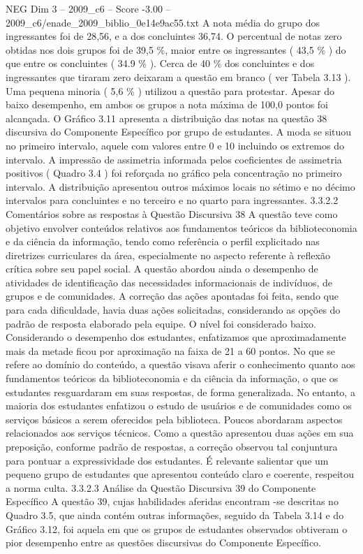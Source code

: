 \begin{textsample}{NEG Dim 3 – 2009\_c6 – Score -3.00 – 2009\_c6/enade\_2009\_biblio\_0e14e9ac55.txt}
A nota média do grupo dos ingressantes foi de 28,56, e a dos concluintes 36,74.
O percentual de notas zero obtidas nos dois grupos foi de 39,5 \%, maior entre os ingressantes ( 43,5 \% ) do que entre os concluintes ( 34.9 \% ).
Cerca de 40 \% dos concluintes e dos ingressantes que tiraram zero deixaram a questão em branco ( ver Tabela 3.13 ).
Uma pequena minoria ( 5,6 \% ) utilizou a questão para protestar.
Apesar do baixo desempenho, em ambos os grupos a nota máxima de 100,0 pontos foi alcançada.
O Gráfico 3.11 apresenta a distribuição das notas na questão 38 discursiva do Componente Específico por grupo de estudantes.
A moda se situou no primeiro intervalo, aquele com valores entre 0 e 10 incluindo os extremos do intervalo.
A impressão de assimetria informada pelos coeficientes de assimetria positivos ( Quadro 3.4 ) foi reforçada no gráfico pela concentração no primeiro intervalo.
A distribuição apresentou outros máximos locais no sétimo e no décimo intervalos para concluintes e no terceiro e no quarto para ingressantes. 3.3.2.2 Comentários sobre as respostas à Questão Discursiva 38 A questão teve como objetivo envolver conteúdos relativos aos fundamentos teóricos da biblioteconomia e da ciência da informação, tendo como referência o perfil explicitado nas diretrizes curriculares da área, especialmente no aspecto referente à reflexão crítica sobre seu papel social.
A questão abordou ainda o desempenho de atividades de identificação das necessidades informacionais de indivíduos, de grupos e de comunidades.
A correção das ações apontadas foi feita, sendo que para cada dificuldade, havia duas ações solicitadas, considerando as opções do padrão de resposta elaborado pela equipe.
O nível foi considerado baixo.
Considerando o desempenho dos estudantes, enfatizamos que aproximadamente mais da metade ficou por aproximação na faixa de 21 a 60 pontos.
No que se refere ao domínio do conteúdo, a questão visava aferir o conhecimento quanto aos fundamentos teóricos da biblioteconomia e da ciência da informação, o que os estudantes resguardaram em suas respostas, de forma generalizada.
No entanto, a maioria dos estudantes enfatizou o estudo de usuários e de comunidades como os serviços básicos a serem oferecidos pela biblioteca.
Poucos abordaram aspectos relacionados aos serviços técnicos.
Como a questão apresentou duas ações em sua preposição, conforme padrão de respostas, a correção observou tal conjuntura para pontuar a expressividade dos estudantes.
É relevante salientar que um pequeno grupo de estudantes que apresentou conteúdo claro e coerente, respeitou a norma culta. 3.3.2.3 Análise da Questão Discursiva 39 do Componente Específico A questão 39, cujas habilidades aferidas encontram -se descritas no Quadro 3.5, que ainda contém outras informações, seguido da Tabela 3.14 e do Gráfico 3.12, foi aquela em que os grupos de estudantes observados obtiveram o pior desempenho entre as questões discursivas do Componente Específico.

\end{textsample}
